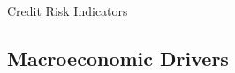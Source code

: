 \documentclass[10pt]{article}
\begin{document}
    \begin{core}{Credit Risk Indicators}






    \end{core}

  \subsection{Macroeconomic Drivers}
\end{document}
